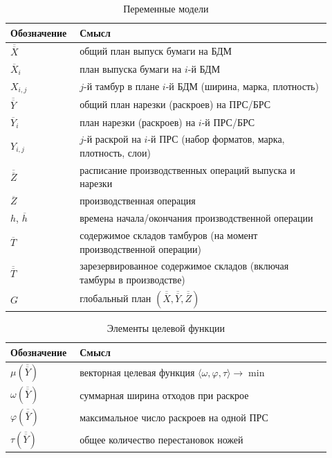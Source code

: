 \begin{table}[htbp]
\centering
\caption{Переменные модели}%
\label{tab:theory_notation_output}%
\begin{tabular}{|p{0.18\linewidth}|p{0.74\linewidth}|}
\hline
\textbf{Обозначение} & \textbf{Смысл} \\
\hline
$\overline{\overline{X}}$ & общий план выпуск бумаги на БДМ \\
\hline
$\overline{X}_i$ & план выпуска бумаги на $i$-й БДМ \\
\hline
$X_{i,j}$ & $j$-й тамбур в плане $i$-й БДМ (ширина, марка, плотность) \\
\hline
$\overline{\overline{Y}}$ & общий план нарезки (раскроев) на ПРС/БРС \\
\hline
$\overline{Y}_i$ & план нарезки (раскроев) на $i$-й ПРС/БРС \\
\hline
$Y_{i,j}$ & $j$-й раскрой на $i$-й ПРС (набор форматов, марка, плотность, слои) \\
\hline
$\overline{\overline{Z}}$ & расписание производственных операций выпуска и нарезки \\
\hline
$\overline{Z}$ & производственная операция \\
\hline
$h$, $\overline{h}$ & времена начала/окончания производственной операции \\
\hline
$\overline{T}$ & содержимое складов тамбуров (на момент производственной операции) \\
\hline
$\overline{\overline{T}}$ & зарезервированное содержимое складов (включая тамбуры в производстве) \\
\hline
$G$ & глобальный план $(\overline{\overline{X}}, \overline{\overline{Y}}, \overline{\overline{Z}})$ \\
\hline
\end{tabular}
\end{table}

\begin{table}[htbp]
\centering
\caption{Элементы целевой функции}%
\label{tab:theory_notation_objective}%
\begin{tabular}{|p{0.18\linewidth}|p{0.74\linewidth}|}
\hline
\textbf{Обозначение} & \textbf{Смысл} \\
\hline
$\mu(\overline{\overline{Y}})$ & векторная целевая функция $\langle \omega, \varphi, \tau \rangle \to \min$ \\
\hline
$\omega(\overline{\overline{Y}})$ & суммарная ширина отходов при раскрое \\
\hline
$\varphi(\overline{\overline{Y}})$ & максимальное число раскроев на одной ПРС \\
\hline
$\tau(\overline{\overline{Y}})$ & общее количество перестановок ножей \\
\hline
\end{tabular}
\end{table}
